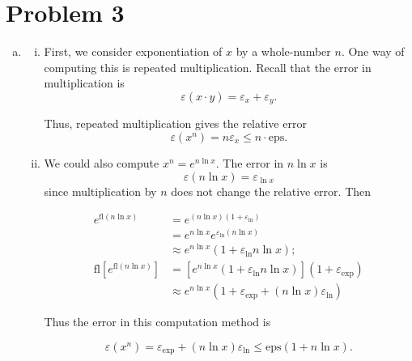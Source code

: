 \documentclass[12pt]{article}
\begin{document}
\section*{Problem 3}
\begin{enumerate}[(a)]
\item
	\begin{enumerate}[(i)]
	\item
	First, we consider exponentiation of $x$ by a whole-number $n$. One way of computing this is repeated multiplication. Recall that the error in multiplication is
	\begin{equation*}
	\varepsilon(x\cdot y) = \varepsilon_x + \varepsilon_y.
	\end{equation*}

	Thus, repeated multiplication gives the relative error
	\begin{equation*}
	\varepsilon(x^n) = n\varepsilon_x \leq n\cdot\mathrm{eps}.
	\end{equation*}
	
	\item
	We could also compute $x^n = e^{n \ln{x}}$. The error in $n \ln{x}$ is
	\begin{equation*}
	\varepsilon(n\ln{x}) = \varepsilon_{\ln{x}}
	\end{equation*}
	since multiplication by $n$ does not change the relative error. Then

	\begin{equation*}
	\begin{aligned}
	e^{\mathrm{fl}(n\ln{x})} &= e^{(n\ln{x})(1+\varepsilon_{\ln})} \\
	&= e^{n\ln{x}}e^{\varepsilon_{\ln}\left(n\ln{x}\right)} \\
	&\approx e^{n\ln{x}} \left(1 + \varepsilon_{\ln} n\ln{x}\right); \\
	\mathrm{fl}\left[e^{\mathrm{fl}(n\ln{x})}\right] &= \left[e^{n\ln{x}} \left(1 + \varepsilon_{\ln} n\ln{x}\right)\right](1 + \varepsilon_\mathrm{exp}) \\
	&\approx e^{n\ln{x}}\left(1 + \varepsilon_{\exp} + (n\ln{x})\varepsilon_{\ln} \right)
	\end{aligned}
	\end{equation*}

	Thus the error in this computation method is

	\begin{equation*}
	\varepsilon(x^n) = \varepsilon_{\exp} + (n\ln{x})\varepsilon_{\ln} \leq \mathrm{eps}(1 + n\ln{x}).
	\end{equation*}


\end{enumerate}
\end{enumerate}
\end{document}
